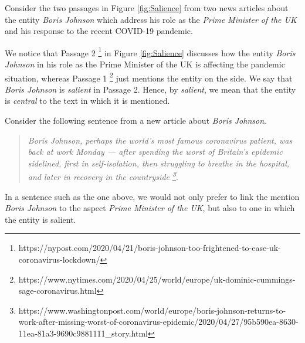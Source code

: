 Consider the two passages in Figure \ref{fig:Salience} from two news articles about the entity \textit{Boris Johnson} which address his role as the \textit{Prime Minister of the UK} and his response to the recent COVID-19 pandemic.

We notice that Passage 2 \footnote{https://nypost.com/2020/04/21/boris-johnson-too-frightened-to-ease-uk-coronavirus-lockdown/} in Figure \ref{fig:Salience} discusses how the entity \textit{Boris Johnson} in his role as the Prime Minister of the UK is affecting the pandemic situation, whereas Passage 1 \footnote{https://www.nytimes.com/2020/04/25/world/europe/uk-dominic-cummings-sage-coronavirus.html} just mentions the entity on the side. We say that \textit{Boris Johnson} is \textit{salient} in Passage 2. Hence, by \textit{salient}, we mean that the entity is \textit{central} to the text in which it is mentioned. 


Consider the following sentence from a new article about \textit{Boris Johnson}.

\begin{quote}
    \textit{Boris Johnson, perhaps the world's most famous coronavirus patient, was back at work Monday — after spending the worst of Britain's epidemic sidelined, first in self-isolation, then struggling to breathe in the hospital, and later in recovery in the countryside \footnote{https://www.washingtonpost.com/world/europe/boris-johnson-returns-to-work-after-missing-worst-of-coronavirus-epidemic/2020/04/27/95b590ea-8630-11ea-81a3-9690c9881111\_story.html}}.
\end{quote}

In a sentence such as the one above, we would not only prefer to link the mention \textit{Boris Johnson} to the aspect \textit{Prime Minister of the UK}, but also to one in which the entity is salient. 

